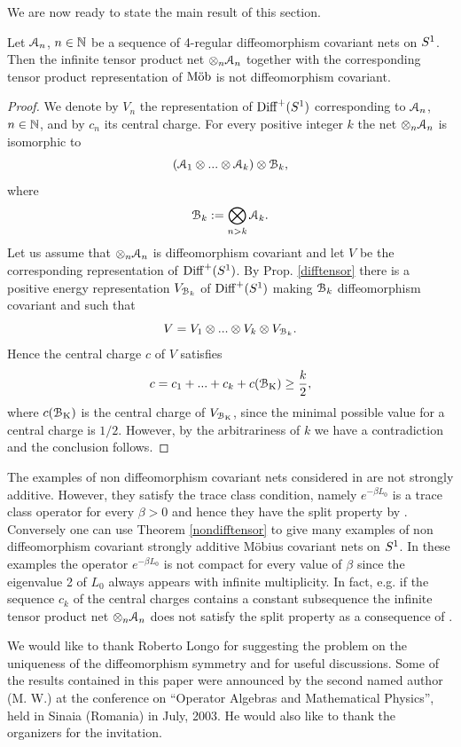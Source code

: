 \documentclass[12pt]{article}
\begin{document}
We are now ready to state the main result of this section. 

\begin{theorem}
\label{nondifftensor}
Let ${\mathcal A}_n$, $n\in {\mathbb N}$ be a sequence of 4-regular 
diffeomorphism covariant nets on $\s1$. Then the infinite tensor product
net $\otimes_n {\mathcal A}_n$ together with the corresponding tensor product
representation of {\rm $\text {M\"{o}b}$} is not diffeomorphism covariant.
\end{theorem}
\begin{proof} We denote by $V_n$ the representation of ${{\rm Diff}^+(S^1)}$ corresponding 
to ${\mathcal A}_n$, $n\in {\mathbb N}$, and by $c_n$ its central charge. For every 
positive integer $k$ the net $\otimes_n {\mathcal A}_n$ is isomorphic to 
$$\left({\mathcal A}_1\otimes ...\otimes {\mathcal A}_k \right)\otimes {\mathcal B}_k,$$
where
$${\mathcal B}_k := \bigotimes_{n>k}{\mathcal A}_k.$$
Let us assume that $\otimes_n{\mathcal A}_n$ is diffeomorphism covariant and let
$V$ be the corresponding representation of ${{\rm Diff}^+(S^1)}$. By Prop. 
\ref{difftensor} there is a positive energy 
representation $V_{{\mathcal B}_k}$ of ${{\rm Diff}^+(S^1)}$ making ${\mathcal B}_k$ diffeomorphism covariant 
and such that 
$$V =V_1\otimes...\otimes V_k \otimes V_{{\mathcal B}_k}.$$
Hence the central charge $c$ of $V$ satisfies 
$$c=c_1+...+c_k+ c({\mathcal B}_{\rm K}) \geq \frac{k}{2},$$
where $c({\mathcal B}_{\rm K})$ is the central charge of $V_{{\mathcal B}_{\rm K}}$, since
the minimal possible value for a central charge is $1/2$. 
However, by the arbitrariness of $k$ we have a contradiction and 
the conclusion follows.
\end{proof}
The examples of non diffeomorphism covariant nets considered in 
\cite{koester03a} are not strongly additive. However, they satisfy the 
trace class condition, namely $e^{-\beta L_0}$ is a trace class operator for 
every $\beta >0$ and hence they have the split property by
\cite[Theorem 3.2]{D'ALR}. Conversely one can use Theorem 
\ref{nondifftensor} to give many examples of non diffeomorphism covariant 
strongly additive M\"obius covariant nets on $\s1$. In these examples 
the operator $e^{-\beta L_0}$ is not compact for every value of $\beta$ 
since the eigenvalue 2 of $L_0$ always appears with infinite multiplicity.
In fact, e.g. if the sequence $c_k$ of the central charges contains a 
constant subsequence the infinite tensor product net 
$\otimes_n {\mathcal A}_n$ does not satisfy the split property as a consequence of 
\cite[Theorem 9.2]{WSSI}. 

\bigskip

 We would like to thank Roberto Longo for 
suggesting the problem on the uniqueness of the diffeomorphism symmetry
and for useful discussions. Some of the results contained in this paper 
were announced by the second named author (M. W.) at the conference 
on ``Operator Algebras and Mathematical Physics'', held in Sinaia
(Romania) in July, 2003. He would also like to thank the organizers for
the invitation.
\end{document}

